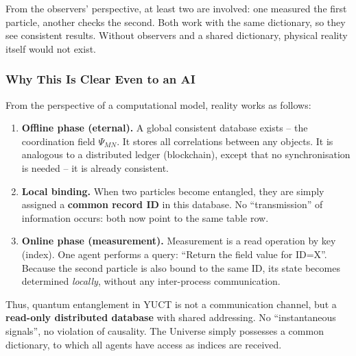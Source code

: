 \documentclass[12pt,a4paper]{article}
\theoremstyle{remark}
\begin{document}
	From the observers' perspective, at least two are involved:
	one measured the first particle, another checks the second.
	Both work with the same dictionary, so they see consistent
	results. Without observers and a shared dictionary,
	physical reality itself would not exist.
	
	\medskip
	
	\subsubsection{Why This Is Clear Even to an AI}
	
	From the perspective of a computational model, reality works
	as follows:
	
	\begin{enumerate}[leftmargin=*]
		\item \textbf{Offline phase (eternal).} A global consistent
		database exists -- the coordination field \(\Psi_{MN}\).
		It stores all correlations between any objects.
		It is analogous to a distributed ledger (blockchain),
		except that no synchronisation is needed -- it is already
		consistent.
		
		\item \textbf{Local binding.} When two particles become
		entangled, they are simply assigned a \textbf{common
			record ID} in this database. No ``transmission'' of
		information occurs: both now point to the same table row.
		
		\item \textbf{Online phase (measurement).} Measurement is
		a read operation by key (index). One agent performs a query:
		``Return the field value for ID=X''. Because the second
		particle is also bound to the same ID, its state becomes
		determined \emph{locally}, without any inter-process
		communication.
	\end{enumerate}
	
	Thus, quantum entanglement in YUCT is not a communication
	channel, but a \textbf{read-only distributed database}
	with shared addressing. No ``instantaneous signals'', no
	violation of causality. The Universe simply possesses a common
	dictionary, to which all agents have access as indices are
	received.
	
\end{document}
